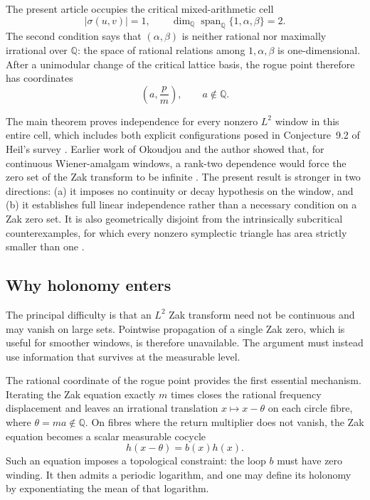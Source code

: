 \documentclass[reqno]{amsart}
\theoremstyle{remark}
\numberwithin{equation}{section}
\newcommand{\Q}{\mathbb{Q}}
\begin{document}
The present article occupies the critical mixed-arithmetic cell
\[
  |\sigma(u,v)|=1,
  \qquad
  \dim_{\Q}\operatorname{span}_{\Q}\{1,\alpha,\beta\}=2.
\]
The second condition says that \((\alpha,\beta)\) is neither rational nor
maximally irrational over \(\Q\): the space of rational relations among
\(1,\alpha,\beta\) is one-dimensional. After a unimodular change of the
critical lattice basis, the rogue point therefore has coordinates
\[
  \left(a,\frac{p}{m}\right),
  \qquad a\notin\Q.
\]

The main theorem proves independence for every nonzero \(L^2\) window in this
entire cell, which includes both explicit configurations posed in
Conjecture~9.2 of Heil's survey
\cite[Conjecture~9.2, p.~173]{HeilSurvey}. Earlier work of Okoudjou and the
author showed that, for continuous Wiener-amalgam windows, a rank-two
dependence would force the zero set of the Zak transform to be infinite
\cite{OkoudjouOussa}. The present result is stronger in two directions: (a) it
imposes no continuity or decay hypothesis on the window, and (b) it establishes
full linear independence rather than a necessary condition on a Zak zero
set. It is also geometrically disjoint from the intrinsically subcritical
counterexamples, for which every nonzero symplectic triangle has area
strictly smaller than one \cite{OussaCounterexample}.

\subsection{Why holonomy enters}

The principal difficulty is that an \(L^2\) Zak transform need not be
continuous and may vanish on large sets. Pointwise propagation of a single
Zak zero, which is useful for smoother windows, is therefore unavailable. The
argument must instead use information that survives at the measurable level.

The rational coordinate of the rogue point provides the first essential
mechanism. Iterating the Zak equation exactly \(m\) times closes the rational
frequency displacement and leaves an irrational translation
\(x\mapsto x-\theta\) on each circle fibre, where \(\theta=ma\notin\Q\).
On fibres where the return multiplier does not vanish, the Zak equation
becomes a scalar measurable cocycle
\[
  h(x-\theta)=b(x)h(x).
\]
Such an equation imposes a topological constraint: the loop \(b\) must have
zero winding. It then admits a periodic logarithm, and one may define its
holonomy by exponentiating the mean of that logarithm.
\end{document}
